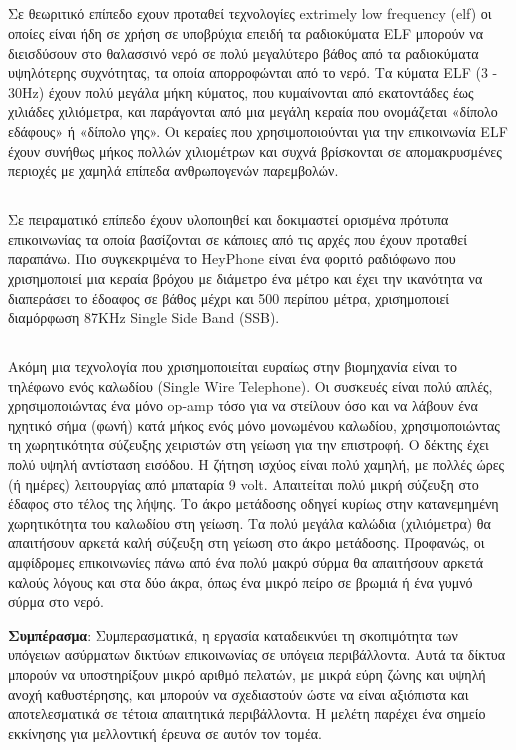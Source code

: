 \documentclass[12pt]{article}
\begin{document}
\begin{multicols}{2}
    \subsection{} Σε θεωριτικό επίπεδο εχουν προταθεί
    τεχνολογίες extrimely low frequency (elf) οι οποίες
    είναι ήδη σε χρήση σε υποβρύχια επειδή τα ραδιοκύματα
    ELF μπορούν να διεισδύσουν στο θαλασσινό νερό σε πολύ
    μεγαλύτερο βάθος από τα ραδιοκύματα υψηλότερης
    συχνότητας, τα οποία απορροφώνται από το νερό. Τα κύματα
    ELF (3 - 30Hz) έχουν πολύ μεγάλα μήκη κύματος, που
    κυμαίνονται από εκατοντάδες έως χιλιάδες χιλιόμετρα, και
    παράγονται από μια μεγάλη κεραία που ονομάζεται «δίπολο
    εδάφους» ή «δίπολο γης». Οι κεραίες που χρησιμοποιούνται
    για την επικοινωνία ELF έχουν συνήθως μήκος πολλών
    χιλιομέτρων και συχνά βρίσκονται σε απομακρυσμένες
    περιοχές με χαμηλά επίπεδα ανθρωπογενών παρεμβολών.

    \subsection{}
    Σε πειραματικό επίπεδο έχουν υλοποιηθεί και δοκιμαστεί
    ορισμένα πρότυπα επικοινωνίας τα οποία βασίζονται σε
    κάποιες από τις αρχές που έχουν προταθεί παραπάνω. Πιο
    συγκεκριμένα το HeyPhone είναι ένα φοριτό ραδιόφωνο που
    χρισημοποιεί μια κεραία βρόχου με διάμετρο ένα μέτρο και
    έχει την ικανότητα να διαπεράσει το έδοαφος σε βάθος
    μέχρι και 500 περίπου μέτρα, χρισημοποιεί διαμόρφωση
    87KHz Single Side Band (SSB).
    \subsection{}
    Ακόμη μια τεχνολογία που χρισημοποιείται ευραίως στην
    βιομηχανία είναι το τηλέφωνο ενός καλωδίου (Single Wire
    Telephone). Οι συσκευές είναι πολύ απλές,
    χρησιμοποιώντας ένα μόνο op-amp τόσο για να στείλουν όσο
    και να λάβουν ένα ηχητικό σήμα (φωνή) κατά μήκος ενός
    μόνο μονωμένου καλωδίου, χρησιμοποιώντας τη χωρητικότητα
    σύζευξης χειριστών στη γείωση για την επιστροφή. Ο
    δέκτης έχει πολύ υψηλή αντίσταση εισόδου. Η ζήτηση
    ισχύος είναι πολύ χαμηλή, με πολλές ώρες (ή ημέρες)
    λειτουργίας από μπαταρία 9 volt. Απαιτείται πολύ μικρή
    σύζευξη στο έδαφος στο τέλος της λήψης. Το άκρο
    μετάδοσης οδηγεί κυρίως στην κατανεμημένη χωρητικότητα
    του καλωδίου στη γείωση. Τα πολύ μεγάλα καλώδια
    (χιλιόμετρα) θα απαιτήσουν αρκετά καλή σύζευξη στη
    γείωση στο άκρο μετάδοσης. Προφανώς, οι αμφίδρομες
    επικοινωνίες πάνω από ένα πολύ μακρύ σύρμα θα απαιτήσουν
    αρκετά καλούς λόγους και στα δύο άκρα, όπως ένα μικρό
    πείρο σε βρωμιά ή ένα γυμνό σύρμα στο νερό.

    \textbf{Συμπέρασμα}: Συμπερασματικά, η εργασία
    καταδεικνύει τη σκοπιμότητα των υπόγειων ασύρματων
    δικτύων επικοινωνίας σε υπόγεια περιβάλλοντα. Αυτά τα
    δίκτυα μπορούν να υποστηρίξουν μικρό αριθμό πελατών, με
    μικρά εύρη ζώνης και υψηλή ανοχή καθυστέρησης, και
    μπορούν να σχεδιαστούν ώστε να είναι αξιόπιστα και
    αποτελεσματικά σε τέτοια απαιτητικά περιβάλλοντα. Η
    μελέτη παρέχει ένα σημείο εκκίνησης για μελλοντική
    έρευνα σε αυτόν τον τομέα.
\end{multicols}
\end{document}
